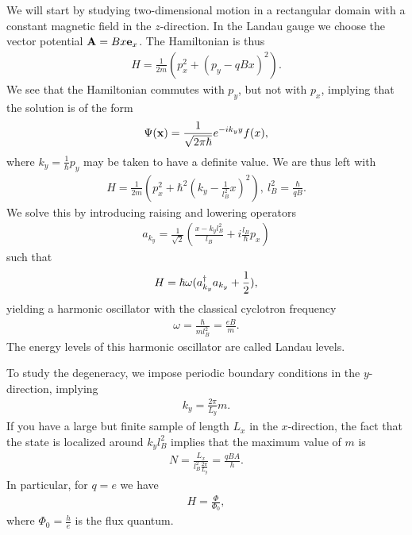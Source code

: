 We will start by studying two-dimensional motion in a rectangular domain with a constant magnetic field in the $z$-direction. In the Landau gauge we choose the vector potential $\vb{A} = Bx\vb{e}_{x}$. The Hamiltonian is thus
\begin{align*}
	H = \frac{1}{2m}\left(p_{x}^{2} + (p_{y} - qBx)^{2}\right).
\end{align*}
We see that the Hamiltonian commutes with $p_{y}$, but not with $p_{x}$, implying that the solution is of the form
\begin{align*}
	\Psi(\vb{x}) = \frac{1}{\sqrt{2\pi\hbar}}e^{-ik_{y}y}f(x),
\end{align*}
where $k_{y} = \frac{1}{\hbar}p_{y}$ may be taken to have a definite value. We are thus left with
\begin{align*}
	H = \frac{1}{2m}\left(p_{x}^{2} + \hbar^{2}\left(k_{y} - \frac{1}{l_{B}^{2}}x\right)^{2}\right),\ l_{B}^{2} = \frac{\hbar}{qB}.
\end{align*}
We solve this by introducing raising and lowering operators
\begin{align*}
	a_{k_{y}} = \frac{1}{\sqrt{2}}\left(\frac{x - k_{y}l_{B}^{2}}{l_{B}} + i\frac{l_{B}}{\hbar}p_{x}\right)
\end{align*}
such that
\begin{align*}
	H = \hbar\omega(a_{k_{y}}^{\dagger}a_{k_{y}} + \frac{1}{2}),
\end{align*}
yielding a harmonic oscillator with the classical cyclotron frequency
\begin{align*}
	\omega = \frac{\hbar}{ml_{B}^{2}} = \frac{eB}{m}.
\end{align*}
The energy levels of this harmonic oscillator are called Landau levels.

To study the degeneracy, we impose periodic boundary conditions in the $y$-direction, implying
\begin{align*}
	k_{y} = \frac{2\pi}{L_{y}}m.
\end{align*}
If you have a large but finite sample of length $L_{x}$ in the $x$-direction, the fact that the state is localized around $k_{y}l_{B}^{2}$ implies that the maximum value of $m$ is
\begin{align*}
	N = \frac{L_{x}}{l_{B}^{2}\frac{2\pi}{L_{y}}} = \frac{qBA}{h}.
\end{align*}
In particular, for $q = e$ we have
\begin{align*}
	H = \frac{\Phi}{\Phi_{0}},
\end{align*}
where $\Phi_{0} = \frac{h}{e}$ is the flux quantum.

